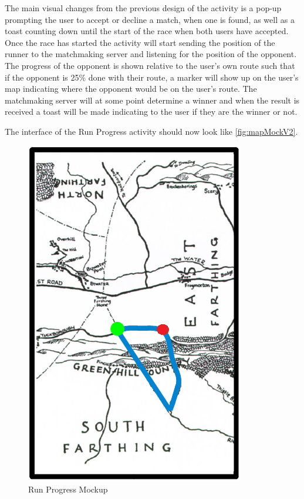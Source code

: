 The main visual changes from the previous design of the  activity is a pop-up prompting the user to accept or decline a match, when one is found, as well as a toast counting down until the start of the race when both users have accepted. Once the race has started the  activity will start sending the position of the runner to the matchmaking server and listening for the position of the opponent. The progress of the opponent is shown relative to the user's own route such that if the opponent is 25\% done with their route, a marker will show up on the user's map indicating where the opponent would be on the user's route. The matchmaking server will at some point determine a winner and when the result is received a toast will be made indicating to the user if they are the winner or not.

The interface of the Run Progress activity should now look like \autoref{fig:mapMockV2}.

\begin{figure}[!ht]
	\begin{center}
		\includegraphics[scale=0.4]{img/mapMockV2.png}
		\caption{Run Progress Mockup}
		\label{fig:mapMockV2}
	\end{center}
\end{figure}


